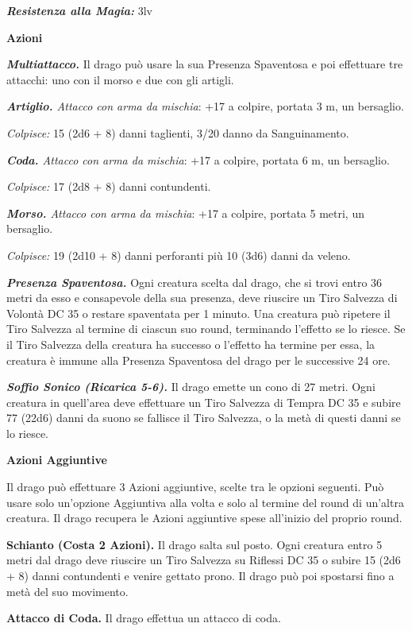 \begin{multicols}{2}
{\emph{\textbf{Resistenza alla Magia:}} 3lv

\textbf{Azioni}

\emph{\textbf{Multiattacco.}} Il drago può usare la sua Presenza Spaventosa e poi effettuare tre attacchi: uno con il morso e due con gli artigli.

\emph{\textbf{Artiglio.} Attacco con arma da mischia}: +17 a colpire, portata 3 m, un bersaglio.

\emph{Colpisce:} 15 (2d6 + 8) danni taglienti, 3/20 danno da Sanguinamento.

\emph{\textbf{Coda.} Attacco con arma da mischia}: +17 a colpire, portata 6 m, un bersaglio.

\emph{Colpisce:} 17 (2d8 + 8) danni contundenti.

\emph{\textbf{Morso.} Attacco con arma da mischia}: +17 a colpire, portata 5 metri, un bersaglio.

\emph{Colpisce:} 19 (2d10 + 8) danni perforanti più 10 (3d6) danni da veleno.

\emph{\textbf{Presenza Spaventosa.}} Ogni creatura scelta dal drago, che si trovi entro 36 metri da esso e consapevole della sua presenza, deve riuscire un Tiro Salvezza di Volontà DC 35 o restare spaventata per 1 minuto. Una creatura può ripetere il Tiro Salvezza al termine di ciascun suo round, terminando l'effetto se lo riesce. Se il Tiro Salvezza della creatura ha successo o l'effetto ha termine per essa, la creatura è immune alla Presenza Spaventosa del drago per le successive 24 ore.

\emph{\textbf{Soffio Sonico (Ricarica 5-6).}} Il drago emette un cono di 27 metri. Ogni creatura in quell'area deve effettuare un Tiro Salvezza di Tempra DC 35 e subire 77 (22d6) danni da suono se fallisce il Tiro Salvezza, o la metà di questi danni se lo riesce.

\textbf{Azioni Aggiuntive}

Il drago può effettuare 3 Azioni aggiuntive, scelte tra le opzioni seguenti. Può usare solo un'opzione Aggiuntiva alla volta e solo al termine del round di un'altra creatura. Il drago recupera le Azioni aggiuntive spese all'inizio del proprio round.

\textbf{Schianto (Costa 2 Azioni).} Il drago salta sul posto. Ogni creatura entro 5 metri dal drago deve riuscire un Tiro Salvezza su Riflessi DC 35 o subire 15 (2d6 + 8) danni contundenti e venire gettato prono. Il drago può poi spostarsi fino a metà del suo movimento.

\textbf{Attacco di Coda.} Il drago effettua un attacco di coda.

}
\end{multicols}
